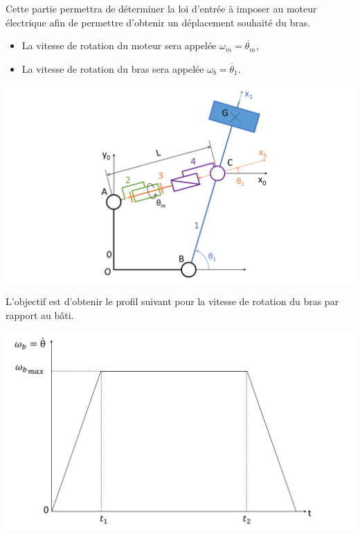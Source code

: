 \newpage


Cette partie permettra de déterminer la loi d'entrée à imposer au moteur électrique afin de permettre d'obtenir un déplacement souhaité du bras.

\begin{itemize}
 \item La vitesse de rotation du moteur sera appelée $\omega_m=\dot{\theta_m}$,
 \item La vitesse de rotation du bras sera appelée $\omega_b=\dot{\theta_1}$.
\end{itemize}
 
\begin{center}
 \includegraphics[width=0.8\linewidth]{img/Maxpid_cin}
\end{center}


L'objectif est d'obtenir le profil suivant pour la vitesse de rotation du bras par rapport au bâti.

\begin{center}
 \includegraphics[width=0.6\linewidth]{img/Maxpid_profil}
\end{center}

